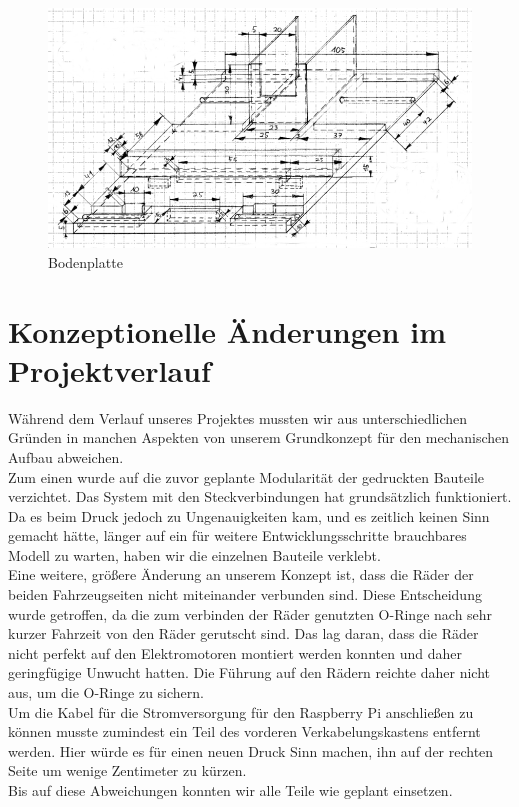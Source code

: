 \begin{figure}
	\includegraphics[width=14.5cm,angle=0]{content/pictures/bodenplatte.png}
	\caption{Bodenplatte}
	\label{fig:bodenplatte}
\end{figure}

\vspace{9cm}
\section{Konzeptionelle Änderungen im Projektverlauf}
Während dem Verlauf unseres Projektes mussten wir aus unterschiedlichen Gründen in manchen Aspekten von unserem Grundkonzept für den mechanischen Aufbau abweichen.\\
Zum einen wurde auf die zuvor geplante Modularität der gedruckten Bauteile verzichtet. Das System mit den Steckverbindungen hat grundsätzlich funktioniert. Da es beim Druck jedoch zu Ungenauigkeiten kam, und es zeitlich keinen Sinn gemacht hätte, länger auf ein für weitere Entwicklungsschritte brauchbares Modell zu warten, haben wir die einzelnen Bauteile verklebt.\\
Eine weitere, größere Änderung an unserem Konzept ist, dass die Räder der beiden Fahrzeugseiten nicht miteinander verbunden sind. Diese Entscheidung wurde getroffen, da die zum verbinden der Räder genutzten O-Ringe nach sehr kurzer Fahrzeit von den Räder gerutscht sind. Das lag daran, dass die Räder nicht perfekt auf den Elektromotoren montiert werden konnten und daher geringfügige Unwucht hatten. Die Führung auf den Rädern reichte daher nicht aus, um die O-Ringe zu sichern.\\
Um die Kabel für die Stromversorgung für den Raspberry Pi anschließen zu können musste zumindest ein Teil des vorderen Verkabelungskastens entfernt werden. Hier würde es für einen neuen Druck Sinn machen, ihn auf der rechten Seite um wenige Zentimeter zu kürzen.\\
Bis auf diese Abweichungen konnten wir alle Teile wie geplant einsetzen.

